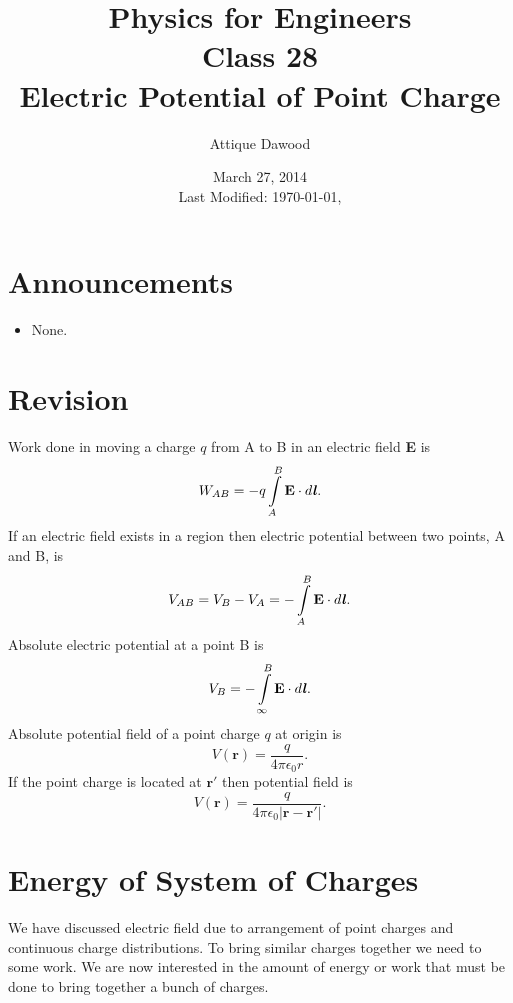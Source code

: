 \documentclass[12pt,a4paper]{article}
\title{\vspace{-3cm}Physics for Engineers\\Class 28\\Electric Potential of Point Charge}
\author{Attique Dawood}
\date{March 27, 2014\\[0.2cm] Last Modified: \today, \currenttime}
\begin{document}
\maketitle
\section{Announcements}
\begin{itemize}
\item None.
\end{itemize}
\section{Revision}
Work done in moving a charge $q$ from A to B in an electric field \textbf{E} is
\begin{equation}
W_{AB}=-q\int\limits_{A}^{B} \textbf{E}\cdot d\textbf{\textit{l}}.
\end{equation}
If an electric field exists in a region then electric potential between two points, A and B, is
\begin{equation}
V_{AB}=V_B-V_A=-\int\limits_{A}^{B} \textbf{E}\cdot d\textbf{\textit{l}}.
\end{equation}
Absolute electric potential at a point B is
\begin{equation}
V_{B}=-\int\limits_{\infty}^{B} \textbf{E}\cdot d\textbf{\textit{l}}.
\end{equation}
Absolute potential field of a point charge $q$ at origin is
\begin{equation}
V(\textbf{r})=\dfrac{q}{4\pi\epsilon_0r}.
\end{equation}
If the point charge is located at $\textbf{r}'$ then potential field is
\begin{equation}
V(\textbf{r})=\dfrac{q}{4\pi\epsilon_0|\textbf{r}-\textbf{r}'|}.
\end{equation}
\section{Energy of System of Charges}
We have discussed electric field due to arrangement of point charges and continuous charge distributions. To bring similar charges together we need to some work. We are now interested in the amount of energy or work that must be done to bring together a bunch of charges.
\end{document}
